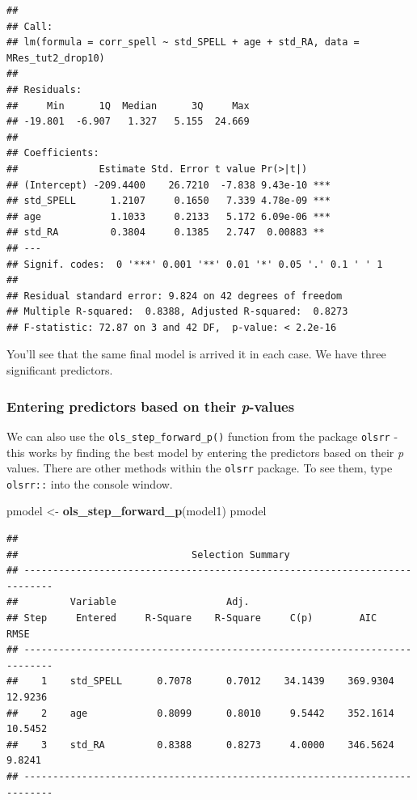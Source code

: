\documentclass[
]{book}
\newenvironment{Shaded}{\begin{snugshade}}{\end{snugshade}}
\newcommand{\FunctionTok}[1]{\textcolor[rgb]{0.13,0.29,0.53}{\textbf{#1}}}
\newcommand{\NormalTok}[1]{#1}
\newcommand{\OtherTok}[1]{\textcolor[rgb]{0.56,0.35,0.01}{#1}}
\begin{document}
\begin{verbatim}
## 
## Call:
## lm(formula = corr_spell ~ std_SPELL + age + std_RA, data = MRes_tut2_drop10)
## 
## Residuals:
##     Min      1Q  Median      3Q     Max 
## -19.801  -6.907   1.327   5.155  24.669 
## 
## Coefficients:
##              Estimate Std. Error t value Pr(>|t|)    
## (Intercept) -209.4400    26.7210  -7.838 9.43e-10 ***
## std_SPELL      1.2107     0.1650   7.339 4.78e-09 ***
## age            1.1033     0.2133   5.172 6.09e-06 ***
## std_RA         0.3804     0.1385   2.747  0.00883 ** 
## ---
## Signif. codes:  0 '***' 0.001 '**' 0.01 '*' 0.05 '.' 0.1 ' ' 1
## 
## Residual standard error: 9.824 on 42 degrees of freedom
## Multiple R-squared:  0.8388, Adjusted R-squared:  0.8273 
## F-statistic: 72.87 on 3 and 42 DF,  p-value: < 2.2e-16
\end{verbatim}

You'll see that the same final model is arrived it in each case. We have three significant predictors.

\hypertarget{entering-predictors-based-on-their-p-values}{%
\subsubsection*{\texorpdfstring{Entering predictors based on their \emph{p}-values}{Entering predictors based on their p-values}}\label{entering-predictors-based-on-their-p-values}}

We can also use the \texttt{ols\_step\_forward\_p()} function from the package \texttt{olsrr} - this works by finding the best model by entering the predictors based on their \emph{p} values. There are other methods within the \texttt{olsrr} package. To see them, type \texttt{olsrr::} into the console window.

\begin{Shaded}
\begin{Highlighting}[]
\NormalTok{pmodel }\OtherTok{\textless{}{-}} \FunctionTok{ols\_step\_forward\_p}\NormalTok{(model1)}
\NormalTok{pmodel}
\end{Highlighting}
\end{Shaded}

\begin{verbatim}
## 
##                              Selection Summary                              
## ---------------------------------------------------------------------------
##         Variable                   Adj.                                        
## Step     Entered     R-Square    R-Square     C(p)        AIC        RMSE      
## ---------------------------------------------------------------------------
##    1    std_SPELL      0.7078      0.7012    34.1439    369.9304    12.9236    
##    2    age            0.8099      0.8010     9.5442    352.1614    10.5452    
##    3    std_RA         0.8388      0.8273     4.0000    346.5624     9.8241    
## ---------------------------------------------------------------------------
\end{verbatim}
\end{document}
